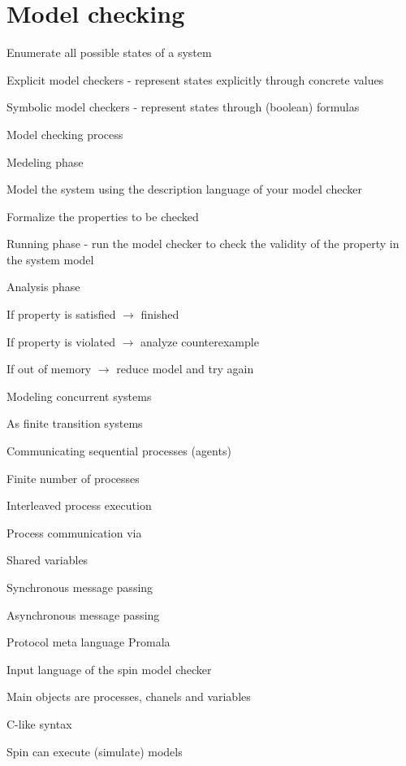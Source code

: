 \section{Model checking}
\enumstart
	\item Enumerate all possible states of a system
	\item Explicit model checkers - represent states explicitly through concrete values
	\item Symbolic model checkers - represent states through (boolean) formulas
	\\ 
	\item Model checking process
	\enumstart
		\item Medeling phase
		\enumstart
			\item Model the system using the description language of your model checker
			\item Formalize the properties to be checked
		\enumend
		\item Running phase - run the model checker to check the validity of the property in the system model
		\item Analysis phase
		\enumstart
			\item If property is satisfied $\rightarrow$ finished
			\item If property is violated $\rightarrow$ analyze counterexample
			\item If out of memory $\rightarrow$ reduce model and try again
		\enumend
		\item Modeling concurrent systems
		\enumstart
			\item As finite transition systems
			\item Communicating sequential processes (agents)
			\enumstart
				\item Finite number of processes
				\item Interleaved process execution
			\enumend
			\item Process communication via
			\enumstart
				\item Shared variables
				\item Synchronous message passing
				\item Asynchronous message passing
			\enumend
			\item Protocol meta language Promala
			\enumstart
				\item Input language of the spin model checker
				\item Main objects are processes, chanels and variables
				\item C-like syntax
				\item Spin can execute (simulate) models
			\enumend
		\enumend
	\enumend
\enumend

